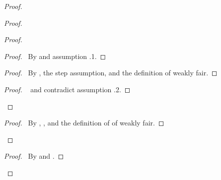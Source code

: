 \documentclass[fleqn,leqno]{article}
\begin{document}
\begin{proof}
\begin{proof}
\begin{proof}
      \begin{proof}
      \pf\ By  and assumption .1.
      \end{proof}
\vspace{.2em}
      \begin{proof}
      \pf\ By , the step  assumption, and 
       the definition
      of weakly fair.
      \end{proof}
\vspace{.2em}
     \qedstep
        \begin{proof}
        \pf\  and  contradict
         assumption .2.
        \end{proof}
   \end{proof}
\vspace{.6em}
\qedstep
\vspace{.2em}
\begin{proof}
\pf\ By , , and the definition of of weakly fair.
\end{proof}
\end{proof}
\vspace{.6em}
\qedstep
\vspace{.2em}
\begin{proof}
\pf\ By  and .
\end{proof}

\end{proof}
\end{document}
